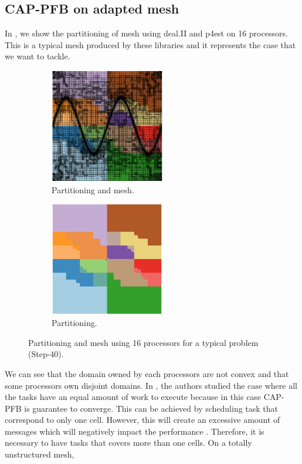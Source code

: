\documentclass[letterpaper]{article}
\renewcommand{\(}{\left(}
\renewcommand{\)}{\right)}
\renewcommand{\[}{\left[}
\renewcommand{\]}{\right]}
\begin{document}
\subsection{CAP-PFB on adapted mesh}
In , we show the partitioning of mesh using deal.II and p4est 
on 16 processors. This is a typical mesh produced by these libraries and it 
represents the case that we want to tackle. 
\begin{figure}[H]
  \begin{subfigure}[b]{.5\textwidth}
    \centering
    \includegraphics[width=5cm]{subdomain_id_0}
    \caption{Partitioning and mesh.}
  \end{subfigure}
  \begin{subfigure}[b]{.5\textwidth}
    \centering
    \includegraphics[width=5cm]{subdomain_id_1}
    \caption{Partitioning.}
  \end{subfigure}
  \caption{Partitioning and mesh using 16 processors for a typical problem
  (Step-40).}
  \label{subdomain_id}
\end{figure}
We can see that the domain owned by each processors are not convex and that some
processors own disjoint domains. In \cite{Mo2014}, the authors studied the case
where all the tasks have an equal amount of work to execute because in this case
CAP-PFB is guarantee to converge. This can be achieved by scheduling task that correspond
to only one cell. However, this will create an excessive amount of messages
which will negatively impact the performance \cite{Pautz2002}. Therefore, it is necessary
to have tasks that covers more than one cells. On a totally unstructured mesh,
\end{document}
